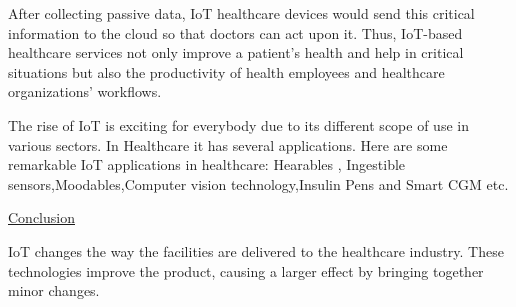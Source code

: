 \documentclass[12pt]{article}
\begin{document}
After collecting passive data, IoT healthcare devices would send this critical information to the cloud so that doctors can act upon it. Thus, IoT-based healthcare services not only improve a patient’s health and help in critical situations but also the productivity of health employees and healthcare organizations’ workflows.

The rise of IoT is exciting for everybody due to its different scope of use in various sectors. In Healthcare it has several applications. Here are some remarkable IoT applications in healthcare:
Hearables , Ingestible sensors,Moodables,Computer vision technology,Insulin Pens and Smart CGM etc.

\underline{Conclusion}

IoT changes the way the facilities are delivered to the healthcare industry. These technologies improve the product, causing a larger effect by bringing together minor changes.









\enddocument
\end{document}

